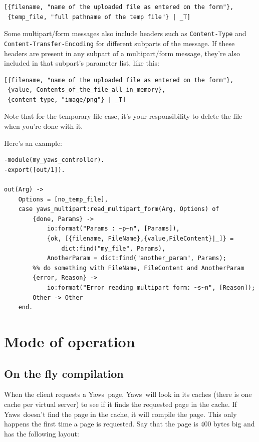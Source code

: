 \documentclass[11pt,oneside,english]{book}
\newcommand{\Yaws}            %
        {{\sc Yaws}}
\begin{document}
\begin{verbatim}
[{filename, "name of the uploaded file as entered on the form"},
 {temp_file, "full pathname of the temp file"} | _T]
\end{verbatim}

Some multipart/form messages also include headers such as
\verb+Content-Type+ and \verb+Content-Transfer-Encoding+ for different
subparts of the message. If these headers are present in any subpart
of a multipart/form message, they're also included in that subpart's
parameter list, like this:

\begin{verbatim}
[{filename, "name of the uploaded file as entered on the form"},
 {value, Contents_of_the_file_all_in_memory},
 {content_type, "image/png"} | _T]
\end{verbatim}

Note that for the temporary file case, it's your responsibility to
delete the file when you're done with it.

Here's an example:

\begin{verbatim}
-module(my_yaws_controller).
-export([out/1]).

out(Arg) ->
    Options = [no_temp_file],
    case yaws_multipart:read_multipart_form(Arg, Options) of
        {done, Params} ->
            io:format("Params : ~p~n", [Params]),
            {ok, [{filename, FileName},{value,FileContent}|_]} =
                dict:find("my_file", Params),
            AnotherParam = dict:find("another_param", Params);
        %% do something with FileName, FileContent and AnotherParam
        {error, Reason} ->
            io:format("Error reading multipart form: ~s~n", [Reason]);
        Other -> Other
    end.
\end{verbatim}


\chapter{Mode of operation}

\section{On the fly compilation}
When the client requests a \Yaws\  page, \Yaws\  will look in its caches
(there is one cache per virtual server) to see if it finds the
requested page in the cache. If \Yaws\  doesn't find the page in the
cache, it will compile the page. This only happens the first time a
page is requested.
Say that the page is 400 bytes big and has the following layout:
\end{document}
